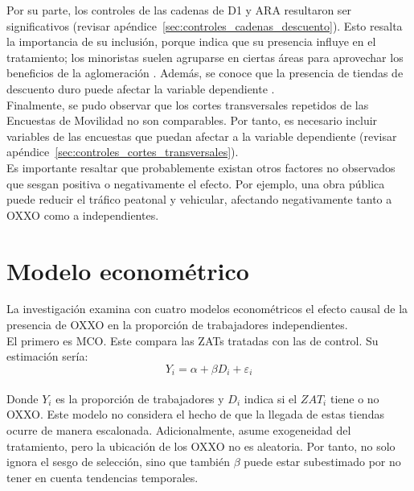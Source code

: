 \documentclass{article}
\begin{document}
Por su parte, los controles de las cadenas de D1 y ARA resultaron ser significativos (revisar apéndice~\ref{sec:controles_cadenas_descuento}). Esto resalta la importancia de su inclusión, porque indica que su presencia influye en el tratamiento; los minoristas suelen agruparse en ciertas áreas para aprovechar los beneficios de la aglomeración \parencite{Konishi2005, Seong2022}. Además, se conoce que la presencia de tiendas de descuento duro puede afectar la variable dependiente \parencite{delgado2024}. \\

Finalmente, se pudo observar que los cortes transversales repetidos de las Encuestas de Movilidad no son comparables. Por tanto, es necesario incluir variables de las encuestas que puedan afectar a la variable dependiente (revisar apéndice~\ref{sec:controles_cortes_transversales}). \\

Es importante resaltar que probablemente existan otros factores no observados que sesgan positiva o negativamente el efecto. Por ejemplo, una obra pública puede reducir el tráfico peatonal y vehicular, afectando negativamente tanto a OXXO como a independientes. \\

\section{Modelo econométrico}

La investigación examina con cuatro modelos econométricos el efecto causal de la presencia de OXXO en la proporción de trabajadores independientes.\\

El primero es MCO. Este compara las ZATs tratadas con las de control. Su estimación sería:\\

\begin{equation}
Y_{i} = \alpha + \beta D_{i} + \varepsilon_{i}
\label{eq:mco}
\end{equation}\\

Donde $Y_{i}$ es la proporción de trabajadores y $D_{i}$ indica si el $ZAT_i$ tiene o no OXXO. Este modelo no considera el hecho de que la llegada de estas tiendas ocurre de manera escalonada. Adicionalmente, asume exogeneidad del tratamiento, pero la ubicación de los OXXO no es aleatoria. Por tanto, no solo ignora el sesgo de selección, sino que también $\beta$ puede estar subestimado por no tener en cuenta tendencias temporales.\\
\end{document}
